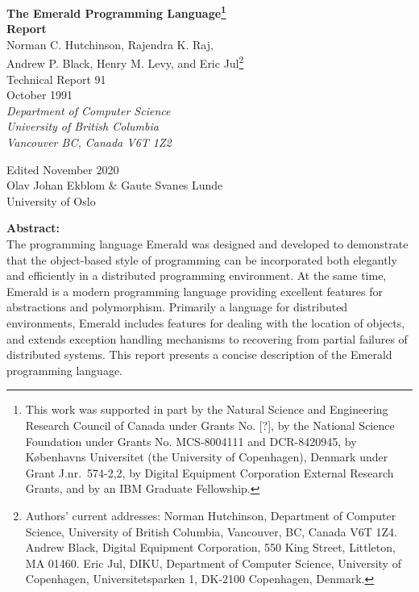 \begin{titlepage}
\vspace*{0.16in}
\begin{center}
\Large
{\bf The Emerald Programming Language\footnote{This work was
supported in part
by the Natural Science and Engineering Research Council of Canada under
Grants No. [?],
by the National Science Foundation under Grants No.
MCS-8004111 and DCR-8420945, by
K{\o}benhavns Universitet (the University of Copenhagen), Denmark under
Grant J.nr.\ 574-2,2, by Digital Equipment Corporation
External Research Grants, and by an IBM Graduate Fellowship.}} \\[0.1in]
\large
{\bf Report} \\
\large
\vspace{2.5ex}
Norman C. Hutchinson, Rajendra K. Raj, \\
Andrew P. Black, Henry M. Levy, and Eric Jul\footnote{Authors' current
addresses:
Norman Hutchinson, Department of Computer Science, University of
British Columbia, Vancouver, BC, Canada V6T 1Z4.
Andrew Black, Digital Equipment Corporation, 550 King Street, Littleton, MA 01460.
Eric Jul, DIKU, Department of Computer Science, University of Copenhagen,
Universitetsparken 1, DK-2100 Copenhagen, Denmark.} \\[0.5in]
\normalsize
Technical Report 91\\
October 1991\\[0.5in]
{\em Department of Computer Science \\
University of British Columbia \\
Vancouver BC, Canada V6T 1Z2} \\

\vspace*{0.2in}

\footnotesize
Edited November 2020 \\
Olav Johan Ekblom \& Gaute Svanes Lunde \\
University of Oslo \\
\large
\vspace{2.5ex}
\end{center}
\vspace*{0.4in}

\begin{center}
\parbox{6.0in}{
{\bf Abstract:}\\[0.15in]
The programming language Emerald was designed and developed to demonstrate
that the object-based style of programming can be incorporated both
elegantly and efficiently in a distributed programming environment.  At
the same time, Emerald is a modern programming language providing excellent
features for abstractions and polymorphism.  Primarily a language for
distributed environments, Emerald includes features for dealing with the
location of objects, and extends exception handling mechanisms to
recovering from partial failures of distributed systems.  This report
presents a concise description of the Emerald programming language.
}
\end{center}
\end{titlepage}
